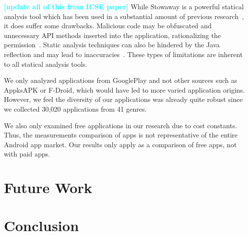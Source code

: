\documentclass{sig-alternate}
\newcommand{\todo}[1]{\textcolor{cyan}{\textbf{[#1]}}}
\begin{document}
\todo{update all of this from ICSE paper}
While Stowaway is a powerful statical analysis tool which has been used in a substantial amount of previous research~\cite{Pearce:2012:APS:2414456.2414498,Stevens_investigatinguser,jeon2011dr}, it does suffer some drawbacks. Malicious code may be obfuscated and unnecessary API methods inserted into the application, rationalizing the permission~\cite{6698893}. Static analysis techniques can also be hindered by the Java reflection and may lead to inaccuracies~\cite{Sridharan:2006:RCP:1133255.1134027,Tripp:2009:TET:1542476.1542486}. These types of limitations are inherent to all statical analysis tools.

We only analyzed applications from GooglePlay and not other sources such as AppksAPK or F-Droid, which would have led to more varied application origins. However, we feel the diversity of our applications was already quite robust since we collected 30,020 applications from 41 genres.

We also only examined free applications in our research due to cost constants. Thus, the measurements comparison of apps is not representative of the entire Android app market. Our results only apply as a comparison of free apps, not with paid apps.






\section{Future Work}
\label{sec: futurework}

% 


\section{Conclusion}
\label{sec: conclusion}





\balance

 

\balancecolumns
\end{document}
